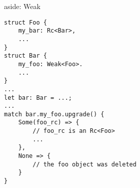 \begin{frame}[fragile]{aside: Weak}
\begin{verbatim}
struct Foo {
    my_bar: Rc<Bar>,
    ...
}
struct Bar {
    my_foo: Weak<Foo>.
    ...
}
...
let bar: Bar = ...;
...
match bar.my_foo.upgrade() {
    Some(foo_rc) => {
        // foo_rc is an Rc<Foo>
        ...
    },
    None => {
        // the foo object was deleted
    }
}
\end{verbatim}
\end{frame}

